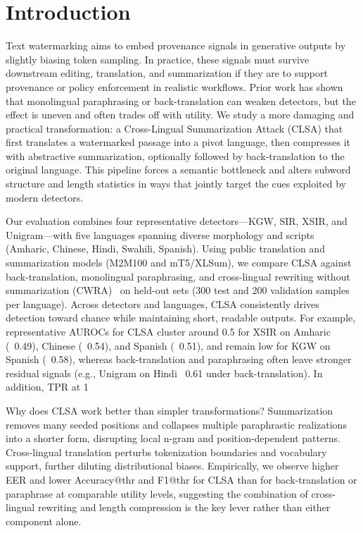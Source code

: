 \documentclass{article}
\begin{document}
\section{Introduction}
Text watermarking aims to embed provenance signals in generative outputs by slightly biasing token sampling. In practice, these signals must survive downstream editing, translation, and summarization if they are to support provenance or policy enforcement in realistic workflows. Prior work has shown that monolingual paraphrasing or back-translation can weaken detectors, but the effect is uneven and often trades off with utility. We study a more damaging and practical transformation: a Cross-Lingual Summarization Attack (CLSA) that first translates a watermarked passage into a pivot language, then compresses it with abstractive summarization, optionally followed by back-translation to the original language. This pipeline forces a semantic bottleneck and alters subword structure and length statistics in ways that jointly target the cues exploited by modern detectors.

Our evaluation combines four representative detectors—KGW, SIR, XSIR, and Unigram—with five languages spanning diverse morphology and scripts (Amharic, Chinese, Hindi, Swahili, Spanish). Using public translation and summarization models (M2M100 and mT5/XLSum), we compare CLSA against back-translation, monolingual paraphrasing, and cross-lingual rewriting without summarization (CWRA)~\citep{He2024cwra} on held-out sets (300 test and 200 validation samples per language). Across detectors and languages, CLSA consistently drives detection toward chance while maintaining short, readable outputs. For example, representative AUROCs for CLSA cluster around 0.5 for XSIR on Amharic (~0.49), Chinese (~0.54), and Spanish (~0.51), and remain low for KGW on Spanish (~0.58), whereas back-translation and paraphrasing often leave stronger residual signals (e.g., Unigram on Hindi ~0.61 under back-translation). In addition, TPR at 1%

Why does CLSA work better than simpler transformations? Summarization removes many seeded positions and collapses multiple paraphrastic realizations into a shorter form, disrupting local n-gram and position-dependent patterns. Cross-lingual translation perturbs tokenization boundaries and vocabulary support, further diluting distributional biases. Empirically, we observe higher EER and lower Accuracy@thr and F1@thr for CLSA than for back-translation or paraphrase at comparable utility levels, suggesting the combination of cross-lingual rewriting and length compression is the key lever rather than either component alone.
\end{document}
